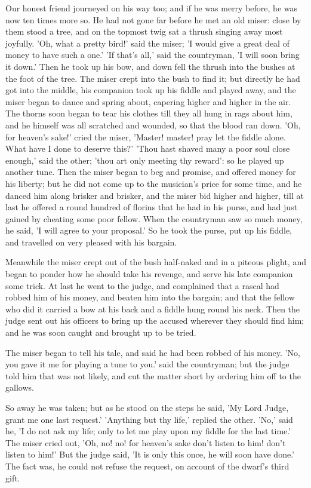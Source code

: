 \documentclass[12pt]{book}
\begin{document}
Our honest friend journeyed on his way too; and if he was merry
before, he was now ten times more so. He had not gone far before he
met an old miser: close by them stood a tree, and on the topmost twig
sat a thrush singing away most joyfully. 'Oh, what a pretty bird!'
said the miser; 'I would give a great deal of money to have such a
one.' 'If that's all,' said the countryman, 'I will soon bring it
down.' Then he took up his bow, and down fell the thrush into the
bushes at the foot of the tree. The miser crept into the bush to find
it; but directly he had got into the middle, his companion took up his
fiddle and played away, and the miser began to dance and spring about,
capering higher and higher in the air. The thorns soon began to tear
his clothes till they all hung in rags about him, and he himself was
all scratched and wounded, so that the blood ran down. 'Oh, for
heaven's sake!' cried the miser, 'Master! master! pray let the fiddle
alone. What have I done to deserve this?' 'Thou hast shaved many a
poor soul close enough,' said the other; 'thou art only meeting thy
reward': so he played up another tune. Then the miser began to beg and
promise, and offered money for his liberty; but he did not come up to
the musician's price for some time, and he danced him along brisker
and brisker, and the miser bid higher and higher, till at last he
offered a round hundred of florins that he had in his purse, and had
just gained by cheating some poor fellow. When the countryman saw so
much money, he said, 'I will agree to your proposal.' So he took the
purse, put up his fiddle, and travelled on very pleased with his
bargain.

Meanwhile the miser crept out of the bush half-naked and in a piteous
plight, and began to ponder how he should take his revenge, and serve
his late companion some trick. At last he went to the judge, and
complained that a rascal had robbed him of his money, and beaten him
into the bargain; and that the fellow who did it carried a bow at his
back and a fiddle hung round his neck. Then the judge sent out his
officers to bring up the accused wherever they should find him; and he
was soon caught and brought up to be tried.

The miser began to tell his tale, and said he had been robbed of his
money. 'No, you gave it me for playing a tune to you.' said the
countryman; but the judge told him that was not likely, and cut the
matter short by ordering him off to the gallows.

So away he was taken; but as he stood on the steps he said, 'My Lord
Judge, grant me one last request.' 'Anything but thy life,' replied
the other. 'No,' said he, 'I do not ask my life; only to let me play
upon my fiddle for the last time.' The miser cried out, 'Oh, no! no!
for heaven's sake don't listen to him! don't listen to him!' But the
judge said, 'It is only this once, he will soon have done.' The fact
was, he could not refuse the request, on account of the dwarf's third
gift.
\end{document}
